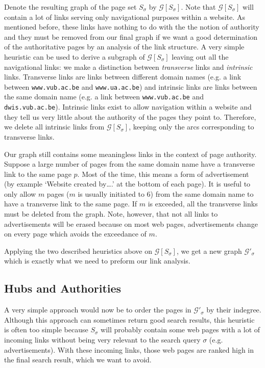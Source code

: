 \documentclass[a4paper,11pt]{report}
\newcommand{\graf}{\mathscr{G}}
\begin{document}
Denote the resulting graph of the page set $S_\sigma$ by $\graf[S_\sigma]$. Note that $\graf[S_\sigma]$ will 
contain 
a lot of links serving only navigational purposes within a website. As mentioned 
before, these links have nothing to do with the the notion of authority and they must be 
removed from our final graph if we want a good determination of  the authoritative pages by an analysis of
 the link structure.  A very simple heuristic can be used to derive a subgraph 
 of $\graf[S_\sigma]$ leaving out all the navigational links: we make a 
 distinction between \emph{transverse} links and \emph{intrinsic} links. 
 Transverse links are links between different domain names (e.g. a link between \texttt{www.vub.ac.be} and
 \texttt{www.ua.ac.be}) and intrinsic links are links between the same domain 
 name (e.g. a link between \texttt{www.vub.ac.be} and
 \texttt{dwis.vub.ac.be}). Intrinsic links exist to allow navigation within a 
 website and they tell us very little about the authority of the pages they 
 point to. Therefore, we delete all intrinsic links from  $\graf[S_\sigma]$, 
 keeping only the arcs corresponding to transverse links.
 
Our graph still contains some meaningless links in the context of page 
 authority. Suppose a large number of pages from the same domain name have a transverse link to 
 the same page $p$. Most of the time, this means a form of advertisement (by example `Website created by\ldots.' at the bottom of each page). It is useful 
 to only allow $m$ pages ($m$ is usually initiated to 6) from the same domain name to have a transverse link to the same page. 
 If $m$ is exceeded, all the transverse links must be deleted from the graph. Note, 
 however, that not all links to advertisements will be erased because on most 
 web pages, advertisements change on every page which avoids the exceedance of $m$.
 
 Applying the two described heuristics above on $\graf[S_\sigma]$, we get a new 
 graph $\graf'_\sigma$ which is exactly what we need to preform our link analysis.
 
 \subsection{Hubs and Authorities} 
 A very simple approach would now be to order the pages in $\graf'_\sigma$ by 
 their indegree. Although this approach can sometimes return good search results, this
 heuristic is often too simple because $S_\sigma$ will probably contain some 
 web pages with a lot of incoming links without being very relevant to the search query $\sigma$ (e.g. advertisements).   
 With these incoming links, those web pages are ranked high in the final search 
 result, which we want to avoid.
\end{document}
